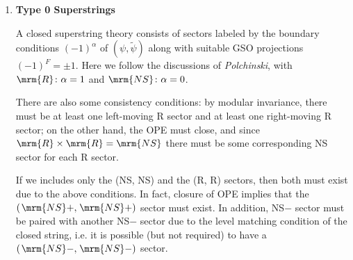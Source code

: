 \documentclass[a4paper,10pt]{article}
\newcommand{\NS}{\ensuremath{\mspace{2mu}\mrm{NS}}}
\begin{document}
\maketitle
\pagestyle{headings}
\thispagestyle{empty}


	\begin{enumerate}
	
	\item \textbf{Type 0 Superstrings}
	
	A closed superstring theory consists of sectors labeled by the boundary conditions $(-1)^\alpha$ of $(\psi,\tilde{\psi})$ along with suitable GSO projections $(-1)^F = \pm 1$. Here we follow the discussions of \textit{Polchinski}, with $\mrm{R}\colon \alpha = 1$ and $\mrm{NS}\colon \alpha = 0$. 
	
	There are also some consistency conditions: by modular invariance, there must be at least one left-moving R sector and at least one right-moving R sector; on the other hand, the OPE must close, and since $\mrm{R} \times \mrm{R} = \mrm{NS}$ there must be some corresponding NS sector for each R sector. 
	
	If we includes only the (NS, NS) and the (R, R) sectors, then both must exist due to the above conditions. In fact, closure of OPE implies that the $(\NS+, \NS+)$ sector must exist. In addition, NS$-$ sector must be paired with another NS$-$ sector due to the level matching condition of the closed string, i.e. it is possible (but not required) to have a $(\NS-, \NS-)$ sector. 
	

\end{enumerate}
\end{document}
